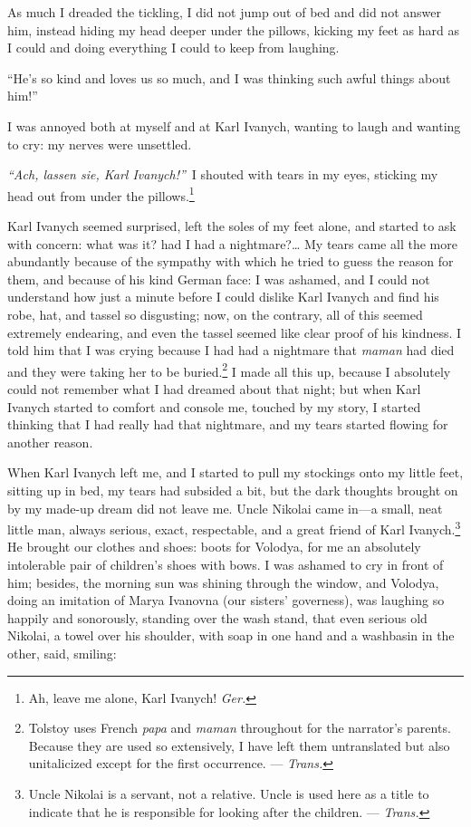 As much I dreaded the tickling, I did not jump out of bed and did not answer him, instead hiding my head deeper under the pillows, kicking my feet as hard as I could and doing everything I could to keep from laughing.

``He's so kind and loves us so much, and I was thinking such awful things about him!'' %

I was annoyed both at myself and at Karl Ivanych, wanting to laugh and wanting to cry: my nerves were unsettled.

\textit{``Ach, lassen sie, Karl Ivanych!''}~I shouted with tears in my eyes, sticking my head out from under the pillows.\footnote{Ah, leave me alone, Karl Ivanych! \textit{Ger.}} %

Karl Ivanych seemed surprised, left the soles of my feet alone, and started to ask with concern: what was it? had I had a nightmare?\ldots{} My tears came all the more abundantly because of the sympathy with which he tried to guess the reason for them, and because of his kind German face: I was ashamed, and I could not understand how just a minute before I could dislike Karl Ivanych and find his robe, hat, and tassel so disgusting; now, on the contrary, all of this seemed extremely endearing, and even the tassel seemed like clear proof of his kindness. I told him that I was crying because I had had a nightmare that \textit{maman} had died and they were taking her to be buried.\footnote{Tolstoy uses French \textit{papa} and \textit{maman} throughout for the narrator's parents. Because they are used so extensively, I have left them untranslated but also unitalicized except for the first occurrence. --- \textit{Trans.}} I made all this up, because I absolutely could not remember what I had dreamed about that night; but when Karl Ivanych started to comfort and console me, touched by my story, I started thinking that I had really had that nightmare, and my tears started flowing for another reason. 

When Karl Ivanych left me, and I started to pull my stockings onto my little feet, sitting up in bed, my tears had subsided a bit, but the dark thoughts brought on by my made-up dream did not leave me. Uncle Nikolai came in---a small, neat little man, always serious, exact, respectable,  and a great friend of Karl Ivanych.\footnote{Uncle Nikolai is a servant, not a relative. Uncle is used here as a title to indicate that he is responsible for looking after the children. --- \textit{Trans.}} He brought our clothes and shoes: boots for Volodya, for me an absolutely intolerable pair of children's shoes with bows. I was ashamed to cry in front of him; besides, the morning sun was shining through the window, and Volodya, doing an imitation of Marya Ivanovna (our sisters' governess), was laughing so happily and sonorously, standing over the wash stand, that even serious old Nikolai, a towel over his shoulder, with soap in one hand and a washbasin in the other, said, smiling:

